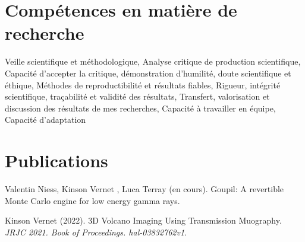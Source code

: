 \documentclass[
	10pt, %
]{FreemanCV}
\begin{document}
\begin{paracol}{2}
\section{Compétences en matière de recherche}
Veille scientifique et méthodologique,
Analyse critique de production scientifique,
Capacité d'accepter la critique, démonstration d'humilité, doute scientifique et éthique,
Méthodes de reproductibilité et résultats fiables,
Rigueur, intégrité scientifique, traçabilité et validité des résultats,
Transfert, valorisation et discussion des résultats de mes recherches,
Capacité à travailler en équipe,
Capacité d'adaptation



\section{Publications}


Valentin Niess, Kinson Vernet , Luca Terray (en cours). Goupil: A revertible Monte Carlo engine for low energy gamma rays.

\medskip %



Kinson Vernet (2022). 3D Volcano Imaging Using Transmission Muography. \textit{JRJC 2021. Book of Proceedings. hal-03832762v1}.

\medskip %







\end{paracol}
\end{document}
